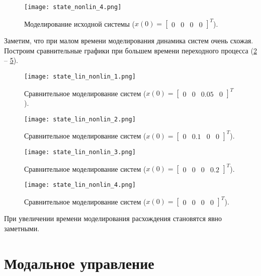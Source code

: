 \begin{figure}[]
    \centering
    \texttt{[image: state\_nonlin\_4.png]}
    \caption{\label{fig:task2_4_4}Моделирование исходной системы ($x(0)=\begin{bmatrix}
        0 & 0 & 0 & 0
    \end{bmatrix}^T$).}
\end{figure}
\pagebreak
Заметим, что при малом времени моделирования динамика систем очень схожая. Построим сравнительные графики при большем времени переходного процесса (\ref{fig:task2_4_5} -- \ref*{fig:task2_4_8}).

\begin{figure}[]
    \centering
    \texttt{[image: state\_lin\_nonlin\_1.png]}
    \caption{\label{fig:task2_4_5}Сравнительное моделирование систем ($x(0)=\begin{bmatrix}
        0 & 0 & 0.05 & 0
    \end{bmatrix}^T$).}
\end{figure}

\begin{figure}[]
    \centering
    \texttt{[image: state\_lin\_nonlin\_2.png]}
    \caption{\label{fig:task2_4_6}Сравнительное моделирование систем ($x(0)=\begin{bmatrix}
        0 & 0.1 & 0 & 0
    \end{bmatrix}^T$).}
\end{figure}

\begin{figure}[]
    \centering
    \texttt{[image: state\_lin\_nonlin\_3.png]}
    \caption{\label{fig:task2_4_7}Сравнительное моделирование систем ($x(0)=\begin{bmatrix}
        0 & 0 & 0 & 0.2
    \end{bmatrix}^T$).}
\end{figure}

\begin{figure}[]
    \centering
    \texttt{[image: state\_lin\_nonlin\_4.png]}
    \caption{\label{fig:task2_4_8}Сравнительное моделирование систем ($x(0)=\begin{bmatrix}
        0 & 0 & 0 & 0
    \end{bmatrix}^T$).}
\end{figure}

\pagebreak
При увеличении времени моделирования расхождения становятся явно заметными.

\section{Модальное управление}

